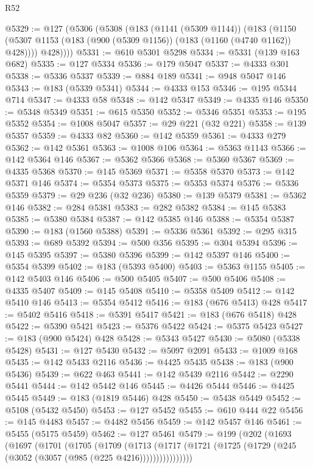 \begin{lexlean}{R52}
\begin{coremodule}
@5329 := @127
    (@5306
      (@5308
        (@183
          (@1141 (@5309 @1144))
          (@183
            (@1150 (@5307 @1153 (@183 (@900 (@5309 @1156)) (@183 (@1160 (@4740 @1162)) @428))))
            @428))))
@5331 := @610 @5301 @5298
@5334 := @5331 (@139 @163 @682)
@5335 := @127 @5334
@5336 := @179 @5047
@5337 := @4333 @301
@5338 := @5336 @5337
@5339 := @884 @189
@5341 := @948 @5047 @146
@5343 := @183 (@5339 @5341)
@5344 := @4333 @153
@5346 := @195 @5344 @714
@5347 := @4333 @58
@5348 := @142 @5347
@5349 := @4335 @146
@5350 := @5348 @5349
@5351 := @615 @5350
@5352 := @5346 @5351
@5353 := @195 @5352
@5354 := @1008 @5047
@5357 := @29 @221 (@32 @221)
@5358 := @139 @5357
@5359 := @4333 @82
@5360 := @142 @5359
@5361 := @4333 @279
@5362 := @142 @5361
@5363 := @1008 @106
@5364 := @5363 @1143
@5366 := @142 @5364 @146
@5367 := @5362 @5366
@5368 := @5360 @5367
@5369 := @4335 @5368
@5370 := @145 @5369
@5371 := @5358 @5370
@5373 := @142 @5371 @146
@5374 := @5354 @5373
@5375 := @5353 @5374
@5376 := @5336 @5359
@5379 := @29 @236 (@32 @236)
@5380 := @139 @5379
@5381 := @5362 @146
@5382 := @284 @5381
@5383 := @282 @5382
@5384 := @145 @5383
@5385 := @5380 @5384
@5387 := @142 @5385 @146
@5388 := @5354 @5387
@5390 := @183 (@1560 @5388)
@5391 := @5336 @5361
@5392 := @295 @315
@5393 := @689 @5392
@5394 := @500 @356
@5395 := @304 @5394
@5396 := @145 @5395
@5397 := @5380 @5396
@5399 := @142 @5397 @146
@5400 := @5354 @5399
@5402 := @183 (@5393 @5400)
@5403 := @5363 @1155
@5405 := @142 @5403 @146
@5406 := @500 @5405
@5407 := @500 @5406
@5408 := @4335 @5407
@5409 := @145 @5408
@5410 := @5358 @5409
@5412 := @142 @5410 @146
@5413 := @5354 @5412
@5416 := @183 (@676 @5413) @428
@5417 := @5402 @5416
@5418 := @5391 @5417
@5421 := @183 (@676 @5418) @428
@5422 := @5390 @5421
@5423 := @5376 @5422
@5424 := @5375 @5423
@5427 := @183 (@900 @5424) @428
@5428 := @5343 @5427
@5430 := @5080 (@5338 @5428)
@5431 := @127 @5430
@5432 := @5097 @2091
@5433 := @1009 @168
@5435 := @142 @5433 @2116
@5436 := @4425 @5435
@5438 := @183 (@900 @5436)
@5439 := @622 @463
@5441 := @142 @5439 @2116
@5442 := @2290 @5441
@5444 := @142 @5442 @146
@5445 := @4426 @5444
@5446 := @4425 @5445
@5449 := @183 (@1819 @5446) @428
@5450 := @5438 @5449
@5452 := @5108 (@5432 @5450)
@5453 := @127 @5452
@5455 := @610 @444 @22
@5456 := @145 @4483
@5457 := @4482 @5456
@5459 := @142 @5457 @146
@5461 := @5455 (@5175 @5459)
@5462 := @127 @5461
@5479 := @199
    (@202
      (@1693
        (@1697
          (@1701
            (@1705
              (@1709
                (@1713
                  (@1717 (@1721 (@1725 (@1729 (@245 (@3052 (@3057 (@985 (@225 @4216))))))))))))))))

\end{coremodule}
\end{lexlean}
